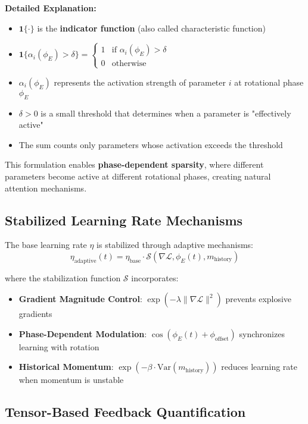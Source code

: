 \textbf{Detailed Explanation:}
\begin{itemize}
    \item $\mathbf{1}\{\cdot\}$ is the \textbf{indicator function} (also called characteristic function)
    \item $\mathbf{1}\{\alpha_i(\phi_E) > \delta\} = \begin{cases} 1 & \text{if } \alpha_i(\phi_E) > \delta \\ 0 & \text{otherwise} \end{cases}$
    \item $\alpha_i(\phi_E)$ represents the activation strength of parameter $i$ at rotational phase $\phi_E$
    \item $\delta > 0$ is a small threshold that determines when a parameter is "effectively active"
    \item The sum counts only parameters whose activation exceeds the threshold
\end{itemize}

This formulation enables \textbf{phase-dependent sparsity}, where different parameters become active at different rotational phases, creating natural attention mechanisms.

\subsection{Stabilized Learning Rate Mechanisms}

The base learning rate $\eta$ is stabilized through adaptive mechanisms:
\begin{equation}
\eta_{\text{adaptive}}(t) = \eta_{\text{base}} \cdot \mathcal{S}(\nabla \mathcal{L}, \phi_E(t), m_{\text{history}})
\end{equation}

where the stabilization function $\mathcal{S}$ incorporates:
\begin{itemize}
    \item \textbf{Gradient Magnitude Control}: $\exp(-\lambda \|\nabla \mathcal{L}\|^2)$ prevents explosive gradients
    \item \textbf{Phase-Dependent Modulation}: $\cos(\phi_E(t) + \phi_{\text{offset}})$ synchronizes learning with rotation
    \item \textbf{Historical Momentum}: $\exp(-\beta \cdot \text{Var}(m_{\text{history}}))$ reduces learning rate when momentum is unstable
\end{itemize}

\subsection{Tensor-Based Feedback Quantification}

